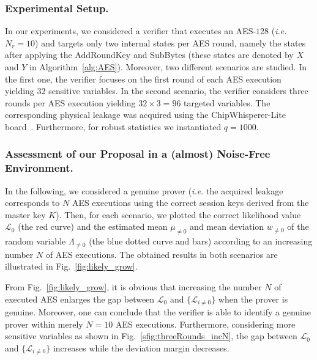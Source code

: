 \subsubsection{Experimental Setup.}
In our experiments, we considered a verifier that executes an AES-$128$ (\emph{i.e.} $N_r= 10$) and targets only two internal states per AES round, namely the states after applying the AddRoundKey and SubBytes (these states are denoted by $X$ and $Y$ in Algorithm~\ref{alg:AES}). 
Moreover, two different scenarios are studied. In the first one, the verifier focuses on the first round of each AES execution yielding $32$ sensitive variables. In the second scenario, the verifier considers three rounds per AES execution yielding $32\times 3 = 96$ targeted variables. The corresponding physical leakage was acquired using the ChipWhisperer-Lite board~\cite{ChipWhisperer}. Furthermore, for robust statistics we instantiated $q = 1000$.

\subsubsection{Assessment of our Proposal in a (almost) Noise-Free Environment.}
In the following, we considered a genuine prover (\emph{i.e.} the acquired leakage corresponds to $N$ AES executions using the correct session keys derived from the master key $K$).
Then, for each scenario, we plotted the correct likelihood value $\mathcal{L}_0$ (the red curve) and the estimated mean $\mu_{\not={0}}$ and mean deviation $w_{\not={0}}$ of the random variable \(\Lambda_{\not={0}}\) (the blue dotted curve and bars) according to an increasing number $N$ of AES executions.
The obtained results in both scenarios are illustrated in Fig.~\ref{fig:likely_grow}.

From Fig.~\ref{fig:likely_grow}, it is obvious that increasing the number $N$ of executed AES enlarges the gap between $\mathcal{L}_0$ and $\{\mathcal{L}_{i \ne 0}\}$ when the prover is genuine. Moreover, one can conclude that the verifier is able to identify a genuine prover within merely $N=10$ AES executions. Furthermore, considering more  sensitive variables as shown in Fig.~\ref{sfig:threeRounds_incN}, the gap between $\mathcal{L}_0$ and $\{\mathcal{L}_{i \ne 0}\}$ increases while the deviation margin decreases.

